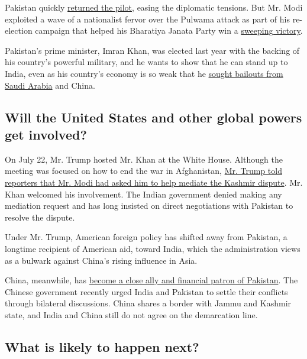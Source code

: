 Pakistan quickly
\href{https://www.nytimes.com/2019/03/01/world/asia/india-pakistan-plane-abhinandan-varthaman-india.html?module=inline}{returned
the pilot}, easing the diplomatic tensions. But Mr. Modi exploited a
wave of a nationalist fervor over the Pulwama attack as part of his
re-election campaign that helped his Bharatiya Janata Party win a
\href{https://www.nytimes.com/2019/05/23/world/asia/narendra-modi-election-win.html}{sweeping
victory}.

Pakistan's prime minister, Imran Khan, was elected last year with the
backing of his country's powerful military, and he wants to show that he
can stand up to India, even as his country's economy is so weak that he
\href{https://www.nytimes.com/2019/02/18/world/asia/saudi-arabia-prince-mohammed-pakistan.html}{sought
bailouts from Saudi Arabia} and China.

\hypertarget{will-the-united-states-and-other-global-powers-get-involved}{%
\subsection{Will the United States and other global powers get
involved?}\label{will-the-united-states-and-other-global-powers-get-involved}}

On July 22, Mr. Trump hosted Mr. Khan at the White House. Although the
meeting was focused on how to end the war in Afghanistan,
\href{https://www.nytimes.com/2019/07/22/world/asia/trump-pakistan-afghanistan.html}{Mr.
Trump told reporters that Mr. Modi had asked him to help mediate the
Kashmir dispute}. Mr. Khan welcomed his involvement. The Indian
government denied making any mediation request and has long insisted on
direct negotiations with Pakistan to resolve the dispute.

Under Mr. Trump, American foreign policy has shifted away from Pakistan,
a longtime recipient of American aid, toward India, which the
administration views as a bulwark against China's rising influence in
Asia.

China, meanwhile, has
\href{https://www.nytimes.com/2018/12/19/world/asia/pakistan-china-belt-road-military.html}{become
a close ally and financial patron of Pakistan}. The Chinese government
recently urged India and Pakistan to settle their conflicts through
bilateral discussions. China shares a border with Jammu and Kashmir
state, and India and China still do not agree on the demarcation line.

\hypertarget{what-is-likely-to-happen-next}{%
\subsection{What is likely to happen
next?}\label{what-is-likely-to-happen-next}}

